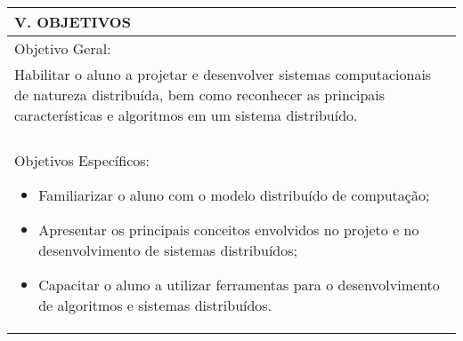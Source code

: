 \documentclass[12pt]{article}
\begin{document}
\begin{longtable}{|L{1.025\textwidth}|} \hline
%
{\bf V. OBJETIVOS } \\ \hline

Objetivo Geral: \\

Habilitar o aluno a projetar e desenvolver sistemas computacionais de natureza distribuída, bem como reconhecer as principais características e algoritmos em um sistema distribuído.\\
\\
Objetivos Específicos:
\begin{itemize}
\item Familiarizar o aluno com o modelo distribuído de computação;
\item Apresentar os principais conceitos envolvidos no projeto e no desenvolvimento de sistemas distribuídos;
\item Capacitar o aluno a utilizar ferramentas para o desenvolvimento de algoritmos e sistemas distribuídos.
\end{itemize}
\\ \hline
\end{longtable}
\end{document}
